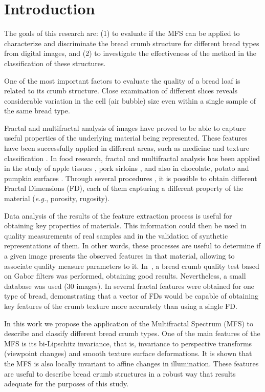\section{Introduction}
\label{intro}
The goals of this research are: (1) to evaluate if the MFS can be applied to characterize and discriminate the bread crumb structure for different bread types from digital images, and (2) to investigate the effectiveness of the method in the classification of these structures.

One of the most important factors to evaluate the quality of a bread loaf is related to its crumb structure. Close examination of different slices reveals considerable variation in the cell (air bubble) size even within a single sample of the same bread type. 

Fractal and multifractal analysis of images have pro\-ved to be able to capture useful properties of the underlying material being represented. These features have been successfully applied in different areas, such as medi\-cine \cite{Andjelkovic2008,Yu2011} and texture classification \cite{Wendt2009}. In food research, fractal and multifractal analysis has been applied in the study of apple tissues \cite{Mendoza2010}, pork sirloins \cite{Serrano2012}, and also in chocolate, potato and pumpkin surfaces \cite{Quevedo2002}. Through several procedures \cite{Peitgen2004,Gonzales2008}, it is possible to obtain different Fractal Dimensions (FD), each of them capturing a different property of the material ({\em e.g.}, porosity, rugosity).

Data analysis of the results of the feature extraction process is useful for obtaining key properties of materials. This information could then be used in quality measurements of real samples and in the validation of synthetic representations of them. In other words, these processes are useful to determine if a given image presents the observed features in that material, allowing to associate quality measure parameters to it. In~\cite{Fan2006}, a bread crumb quality test based on Gabor filters was performed, obtaining good results. Nevertheless, a small database was used ($30$ images). In \cite{Gonzales2008} several fractal features were obtained for one type of bread, demonstrating that a vector of FDs would be capable of obtaining key features of the crumb texture more accurately than using a single FD.

In this work we propose the application of the Multifractal Spectrum (MFS) \cite{Xu2009} to describe and classify different bread crumb types. One of the main features of the MFS is its bi-Lipschitz invariance, that is, invariance to perspective transforms (viewpoint changes) and smooth texture surface deformations. It is shown that the MFS is also locally invariant to affine changes in illumination. These features are useful to describe bread crumb structures in a robust way that results adequate for the purposes of this study.

